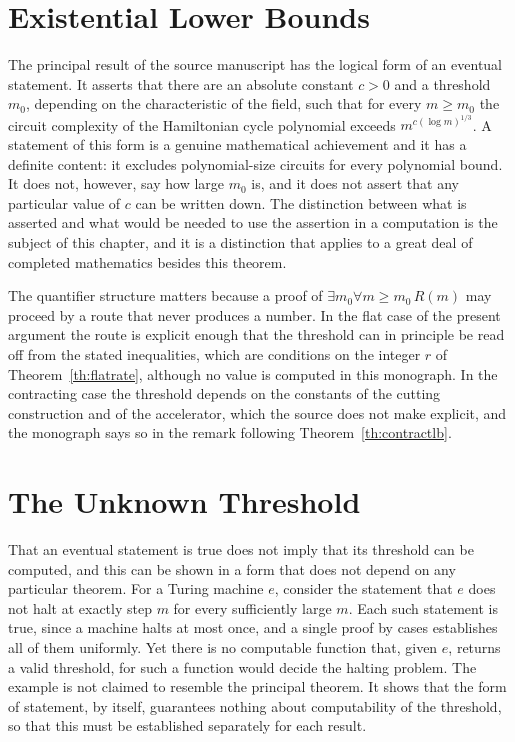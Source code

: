 \documentclass[11pt,letterpaper]{report}
\theoremstyle{plain}
\theoremstyle{definition}
\theoremstyle{remark}
\begin{document}
\section{Existential Lower Bounds}

The principal result of the source manuscript has the logical form of an eventual statement. It asserts that there are an absolute constant $c>0$ and a threshold $m_0$, depending on the characteristic of the field, such that for every $m\ge m_0$ the circuit complexity of the Hamiltonian cycle polynomial exceeds $m^{c(\log m)^{1/3}}$. A statement of this form is a genuine mathematical achievement and it has a definite content: it excludes polynomial-size circuits for every polynomial bound. It does not, however, say how large $m_0$ is, and it does not assert that any particular value of $c$ can be written down. The distinction between what is asserted and what would be needed to use the assertion in a computation is the subject of this chapter, and it is a distinction that applies to a great deal of completed mathematics besides this theorem.

The quantifier structure matters because a proof of $\exists m_0\forall m\ge m_0\,R(m)$ may proceed by a route that never produces a number. In the flat case of the present argument the route is explicit enough that the threshold can in principle be read off from the stated inequalities, which are conditions on the integer $r$ of Theorem~\ref{th:flatrate}, although no value is computed in this monograph. In the contracting case the threshold depends on the constants of the cutting construction and of the accelerator, which the source does not make explicit, and the monograph says so in the remark following Theorem~\ref{th:contractlb}.

\section{The Unknown Threshold}

That an eventual statement is true does not imply that its threshold can be computed, and this can be shown in a form that does not depend on any particular theorem. For a Turing machine $e$, consider the statement that $e$ does not halt at exactly step $m$ for every sufficiently large $m$. Each such statement is true, since a machine halts at most once, and a single proof by cases establishes all of them uniformly. Yet there is no computable function that, given $e$, returns a valid threshold, for such a function would decide the halting problem. The example is not claimed to resemble the principal theorem. It shows that the form of statement, by itself, guarantees nothing about computability of the threshold, so that this must be established separately for each result.
\end{document}
